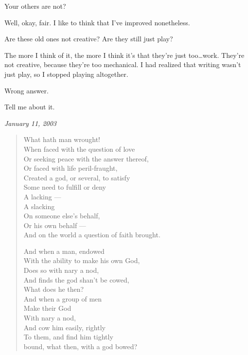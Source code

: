 \begin{paracol}{2}
\begin{leftcolumn}
\begin{ally}
Your others are not?
\end{ally}
Well, okay, fair. I like to think that I've improved nonetheless.

\begin{ally}
Are these old ones not creative? Are they still just play?
\end{ally}
The more I think of it, the more I think it's that they're just too\ldots{}work. They're not creative, because they're too mechanical. I had realized that writing wasn't just play, so I stopped playing altogether.

\begin{ally}
Wrong answer.
\end{ally}
Tell me about it.
\newpage


\emph{January 11, 2003}

\begin{verse}
What hath man wrought!\\
\vin When faced with the question of love\\
\vin Or seeking peace with the answer thereof,\\
Or faced with life peril-fraught,\\
\vin Created a god, or several, to satisfy\\
\vin Some need to fulfill or deny\\
\vin \vin A lacking ---\\
\vin \vin A slacking\\
\vin On someone else's behalf,\\
\vin Or his own behalf ---\\
And on the world a question of faith brought.

And when a man, endowed\\
\vin With the ability to make his own God,\\
\vin Does so with nary a nod,\\
And finds the god shan't be cowed,\\
\vin What does he then?\\
\vin And when a group of men\\
\vin \vin Make their God\\
\vin \vin With nary a nod,\\
\vin And cow him easily, rightly\\
\vin To them, and find him tightly\\
bound, what then, with a god bowed?


\end{verse}
\end{leftcolumn}
\end{paracol}
